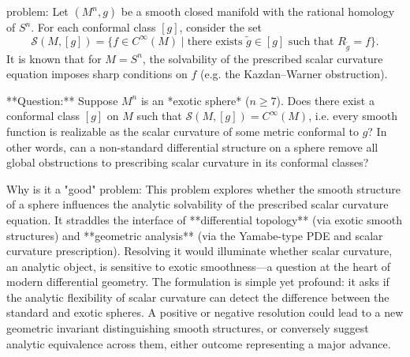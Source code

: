 problem:  
Let \( (M^n, g) \) be a smooth closed manifold with the rational homology of \( S^n \). For each conformal class \([g]\), consider the set  
\[
\mathcal{S}(M,[g]) = \{ f \in C^\infty(M) \mid \text{there exists } \tilde{g} \in [g] \text{ such that } R_{\tilde{g}} = f \}.
\]  
It is known that for \( M = S^n \), the solvability of the prescribed scalar curvature equation imposes sharp conditions on \( f \) (e.g. the Kazdan–Warner obstruction).   
  
**Question:** Suppose \(M^n\) is an *exotic sphere* (\(n \ge 7\)). Does there exist a conformal class \([g]\) on \(M\) such that \(\mathcal{S}(M,[g]) = C^\infty(M)\), i.e. every smooth function is realizable as the scalar curvature of some metric conformal to \(g\)?  
In other words, can a non-standard differential structure on a sphere remove all global obstructions to prescribing scalar curvature in its conformal classes?  

Why is it a "good" problem:  
This problem explores whether the smooth structure of a sphere influences the analytic solvability of the prescribed scalar curvature equation. It straddles the interface of **differential topology** (via exotic smooth structures) and **geometric analysis** (via the Yamabe-type PDE and scalar curvature prescription). Resolving it would illuminate whether scalar curvature, an analytic object, is sensitive to exotic smoothness—a question at the heart of modern differential geometry. The formulation is simple yet profound: it asks if the analytic flexibility of scalar curvature can detect the difference between the standard and exotic spheres. A positive or negative resolution could lead to a new geometric invariant distinguishing smooth structures, or conversely suggest analytic equivalence across them, either outcome representing a major advance.